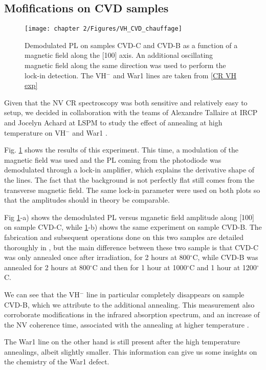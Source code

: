 \documentclass[a4paper, 11pt]{report}
\begin{document}
\subsection{Mofifications on CVD samples}
\begin{figure}[h]
\centering
\texttt{[image: chapter 2/Figures/VH\_CVD\_chauffage]}
\caption{Demodulated PL on samples CVD-C and CVD-B as a function of a magnetic field along the [100] axis. An additional oscillating magnetic field along the same direction was used to perform the lock-in detection. The VH$^-$ and War1 lines are taken from \ref{CR VH exp}}
\label{chauffage CVD}
\end{figure}

Given that the NV CR spectroscopy was both sensitive and relatively easy to setup, we decided in collaboration with the teams of Alexandre Tallaire at IRCP and Jocelyn Achard at LSPM to study the effect of annealing at high temperature on VH$^-$ and War1 \citep{ngambou2022improving}.

Fig. \ref{chauffage CVD} shows the results of this experiment. This time, a modulation of the magnetic field was used and the PL coming from the photodiode was demodulated through a lock-in amplifier, which explains the derivative shape of the lines. The fact that the background is not perfectly flat still comes from the transverse magnetic field. The same lock-in parameter were used on both plots so that the amplitudes should in theory be comparable.

Fig \ref{chauffage CVD}-a) shows the demodulated PL versus mganetic field amplitude along [100] on sample CVD-C, while \ref{chauffage CVD}-b) shows the same experiment on sample CVD-B. The fabrication and subsequent operations done on this two samples are detailed thoroughly in \citep{ngambou2022improving}, but the main difference between these two sample is that CVD-C was only annealed once after irradiation, for 2 hours at 800$^\circ$C, while CVD-B was annealed for 2 hours at 800$^\circ$C and then for 1 hour at 1000$^\circ$C and 1 hour at 1200$^\circ$C.

We can see that the VH$^-$ line in particular completely disappears on sample CVD-B, which we attribute to the additional annealing. This measurement also corroborate modifications in the infrared absorption spectrum, and an increase of the NV coherence time, associated with the annealing at higher temperature \citep{ngambou2022improving}.

The War1 line on the other hand is still present after the high temperature annealings, albeit slightly smaller. This information can give us some insights on the chemistry of the War1 defect. %
\end{document}
